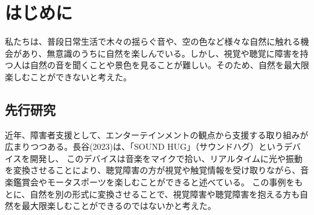 \tableofcontents
\newpage

\pagestyle{fancy}
\fancyhf{}
\renewcommand{\headrulewidth}{0pt}
\makeatletter
\let\ps@plain\ps@fancy
\makeatother
\setlength{\headsep}{20pt}

\chapter{はじめに}
私たちは、普段日常生活で木々の揺らぐ音や、空の色など様々な自然に触れる機会があり、無意識のうちに自然を楽しんでいる。しかし、視覚や聴覚に障害を持つ人は自然の音を聞くことや景色を見ることが難しい。そのため、自然を最大限楽しむことができないと考えた。

\section{先行研究}
近年、障害者支援として、エンターテインメントの観点から支援する取り組みが広まりつつある。長谷(2023)\cite{SOUNDHUG}は、「SOUND HUG」（サウンドハグ）というデバイスを開発し、
このデバイスは⾳楽をマイクで拾い、リアルタイムに光や振動を変換させることにより、聴覚障害の方が視覚や触覚情報を受け取りながら、音楽鑑賞会やモータスポーツを楽しむことができると述べている。
この事例をもとに、自然を別の形式に変換させることで、視覚障害や聴覚障害を抱える方も自然を最大限楽しむことができるのではないかと考えた。

